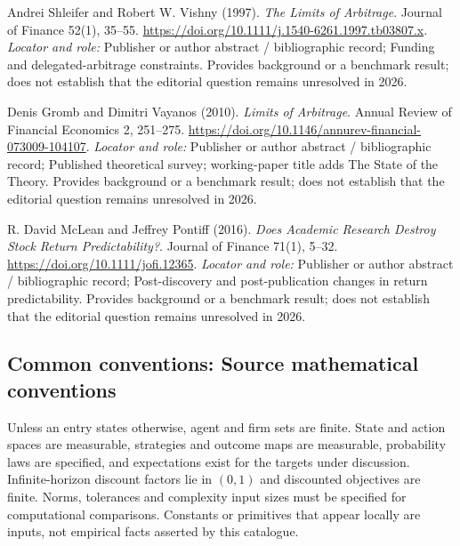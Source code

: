 \documentclass[11pt,a4paper]{article}
\begin{document}
\begin{enumerate}[label={[S\arabic*]},leftmargin=*]

\item Andrei Shleifer and Robert W. Vishny (1997). \emph{The Limits of Arbitrage}. Journal of Finance 52(1), 35–55. \url{https://doi.org/10.1111/j.1540-6261.1997.tb03807.x}.
\textit{Locator and role:} Publisher or author abstract / bibliographic record; Funding and delegated-arbitrage constraints. Provides background or a benchmark result; does not establish that the editorial question remains unresolved in 2026.

\item Denis Gromb and Dimitri Vayanos (2010). \emph{Limits of Arbitrage}. Annual Review of Financial Economics 2, 251–275. \url{https://doi.org/10.1146/annurev-financial-073009-104107}.
\textit{Locator and role:} Publisher or author abstract / bibliographic record; Published theoretical survey; working-paper title adds The State of the Theory. Provides background or a benchmark result; does not establish that the editorial question remains unresolved in 2026.

\item R. David McLean and Jeffrey Pontiff (2016). \emph{Does Academic Research Destroy Stock Return Predictability?}. Journal of Finance 71(1), 5–32. \url{https://doi.org/10.1111/jofi.12365}.
\textit{Locator and role:} Publisher or author abstract / bibliographic record; Post-discovery and post-publication changes in return predictability. Provides background or a benchmark result; does not establish that the editorial question remains unresolved in 2026.

\end{enumerate}

\subsection*{Common conventions: Source mathematical conventions}

Unless an entry states otherwise, agent and firm sets are finite. State and action spaces are measurable, strategies and outcome maps are measurable, probability laws are specified, and expectations exist for the targets under discussion. Infinite-horizon discount factors lie in $(0,1)$ and discounted objectives are finite. Norms, tolerances and complexity input sizes must be specified for computational comparisons. Constants or primitives that appear locally are inputs, not empirical facts asserted by this catalogue.
\end{document}
